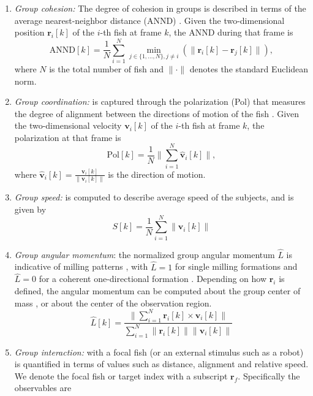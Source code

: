 \documentclass[12pt]{article}
\def\bs{\boldsymbol}
\newcommand{\norm}[1]{\lVert#1\rVert}
\begin{document}
\begin{enumerate}
\item \emph{Group cohesion:} The degree of cohesion in groups is described in terms of the average nearest-neighbor distance (ANND) \cite{Webster2007, Kolpas2008}. Given the two-dimensional position $\bs{r}_i[k]$ of the $i$-th fish at frame $k$, the ANND during that frame is \cite{Kolpas2008}
\begin{equation}
\mathrm{ANND}[k]=\frac{1}{N}\sum_{i=1}^N\min_{j\in \{1,\ldots,N\}, j\ne i}(\norm{\bs{r}_i[k]-\bs{r}_j[k]}),
\end{equation}
where $N$ is the total number of fish and $\norm{\cdot}$ denotes the standard Euclidean norm. 
\item \emph{Group coordination:} is captured through the polarization (Pol) that measures the degree of alignment between the directions of motion of the fish \cite{Vicsek1995}. Given the two-dimensional velocity $\bs{v}_i[k]$ of the $i$-th fish at frame $k$, the polarization at that frame is
\begin{equation}
\mathrm{Pol}[k]=\frac{1}{N}\Big\|\sum_{i=1}^N\hat{\bs{v}}_i[k]\Big\|, 
\end{equation} 
where $\hat{\bs{v}}_i[k] =\frac{\bs{v}_i[k]}{\norm{\bs{v}_i[k]}}$ is the direction of motion. 
\item \emph{Group speed:} is computed to describe average speed of the subjects, and is  given by 
\begin{equation}
S[k]=\frac{1}{N}\sum_{i=1}^N\|\bs{v}_i[k]\|
\end{equation}
\item \emph{Group angular momentum}: the normalized group angular momentum $\hat{L}$ is indicative of milling patterns \cite{Chuang2007, Couzin2003a}, with $\hat{L}=1$ for single milling formations and  $\hat{L}=0$ for a coherent one-directional formation \cite{Chuang2007}. Depending on how $\bs{r}_i$ is defined, the angular momentum can be computed about the group center of mass \cite{Aureli2012}, or about the center of the observation region.
\begin{equation}
\hat{L}[k]=\frac{\|\sum_{i=1}^N\bs{r}_i[k]\times\bs{v}_i[k]\|}{\sum_{i=1}^N\|\bs{r}_i[k]\|\|\bs{v}_i[k]\|}
\end{equation}
\item \emph{Group interaction:} with a focal fish (or an external stimulus such as a robot) is quantified in terms of values such as distance, alignment and relative speed. We denote the focal fish or target index with a subscript $\bs{r}_f$. Specifically the observables are

\end{enumerate}
\end{document}
